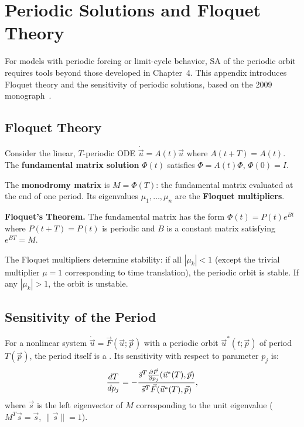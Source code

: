 
\chapter{Periodic Solutions and Floquet Theory}
\label{app:floquet}

For models with periodic forcing or limit-cycle behavior, SA of the
periodic orbit requires tools beyond those developed in Chapter~4.
This appendix introduces Floquet theory and the sensitivity of
periodic solutions, based on the 2009 monograph~\cite{arriola2009sensitivity}.

\section{Floquet Theory}
\label{appsec:floquet}

Consider the linear, $T$-periodic ODE $\dot{\vec{u}} = A(t)\vec{u}$
where $A(t+T) = A(t)$. The \textbf{fundamental matrix solution}
$\Phi(t)$ satisfies $\dot{\Phi} = A(t)\Phi$, $\Phi(0) = I$.

The \textbf{monodromy matrix} is $M = \Phi(T)$: the fundamental
matrix evaluated at the end of one period. Its eigenvalues
$\mu_1, \ldots, \mu_n$ are the \textbf{Floquet multipliers}.

\textbf{Floquet's Theorem.} The fundamental matrix has the form
$\Phi(t) = P(t)e^{Bt}$ where $P(t+T) = P(t)$ is periodic and
$B$ is a constant matrix satisfying $e^{BT} = M$.

The Floquet multipliers determine stability:
if all $|\mu_k| < 1$ (except the trivial multiplier $\mu = 1$
corresponding to time translation), the periodic orbit is stable.
If any $|\mu_k| > 1$, the orbit is unstable.

\section{Sensitivity of the Period}
\label{appsec:periodsens}

For a nonlinear system $\dot{\vec{u}} = \vec{F}(\vec{u}; \vec{p})$
with a periodic orbit $\vec{u}^*(t; \vec{p})$ of period $T(\vec{p})$,
the period itself is a \QOI. Its sensitivity with respect to parameter
$p_j$ is:
\begin{equation}
  \frac{d T}{d p_j} = -\frac{\vec{s}^T\frac{\partial \vec{F}}{\partial p_j}(\vec{u}^*(T), \vec{p})}
                       {\vec{s}^T\vec{F}(\vec{u}^*(T), \vec{p})},
  \label{eq:periodsens}
\end{equation}
where $\vec{s}$ is the left eigenvector of $M$ corresponding to
the unit eigenvalue ($M^T\vec{s} = \vec{s}$, $\|\vec{s}\| = 1$).

